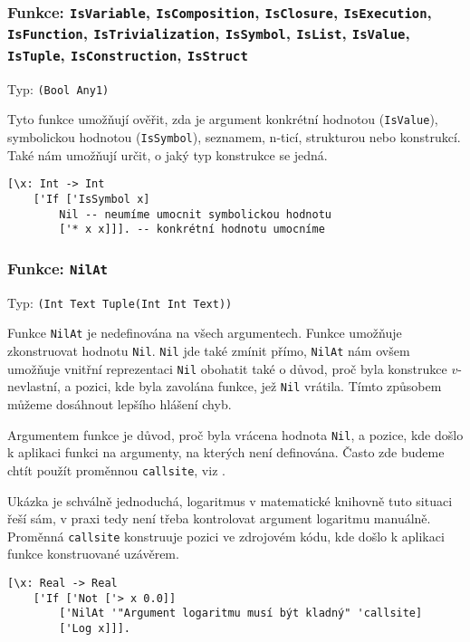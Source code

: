 \subsubsection*{Funkce:
\lstinline{IsVariable},
\lstinline{IsComposition},
\lstinline{IsClosure},
\lstinline{IsExecution},
\lstinline{IsFunction},
\lstinline{IsTrivialization},
\lstinline{IsSymbol},
\lstinline{IsList},
\lstinline{IsValue},
\lstinline{IsTuple},
\lstinline{IsConstruction},
\lstinline{IsStruct}
}

Typ: \lstinline{(Bool Any1)}

Tyto funkce umožňují ověřit, zda je argument konkrétní hodnotou (\lstinline{IsValue}), symbolickou
hodnotou (\lstinline{IsSymbol}), seznamem, n-ticí, strukturou nebo konstrukcí. Také nám umožňují
určit, o jaký typ konstrukce se jedná.

\begin{lstlisting}[caption={Ukázka využití IsSymbol}]
[\x: Int -> Int
    ['If ['IsSymbol x]
        Nil -- neumíme umocnit symbolickou hodnotu
        ['* x x]]]. -- konkrétní hodnotu umocníme
\end{lstlisting}

\subsubsection*{Funkce: \lstinline{NilAt}}\label{nilat-fn}
Typ: \lstinline{(Int Text Tuple(Int Int Text))}

Funkce \lstinline{NilAt} je nedefinována na všech argumentech. Funkce umožňuje zkonstruovat hodnotu
\lstinline{Nil}. \lstinline{Nil} jde také zmínit přímo, \lstinline{NilAt} nám ovšem umožňuje vnitřní
reprezentaci \lstinline{Nil} obohatit také o důvod, proč byla konstrukce $v$-nevlastní, a pozici,
kde byla zavolána funkce, jež \lstinline{Nil} vrátila. Tímto způsobem můžeme dosáhnout lepšího
hlášení chyb.

Argumentem funkce je důvod, proč byla vrácena hodnota \lstinline{Nil}, a pozice, kde došlo
k aplikaci funkci na argumenty, na kterých není definována. Často zde budeme chtít použít proměnnou
\lstinline{callsite}, viz .

Ukázka je schválně jednoduchá, logaritmus v matematické knihovně tuto situaci řeší sám, v praxi tedy
není třeba kontrolovat argument logaritmu manuálně. Proměnná \lstinline{callsite} konstruuje
pozici ve zdrojovém kódu, kde došlo k aplikaci funkce konstruované uzávěrem.

\begin{lstlisting}[caption={Ukázka využití NilAt}]
[\x: Real -> Real
    ['If ['Not ['> x 0.0]]
        ['NilAt '"Argument logaritmu musí být kladný" 'callsite]
        ['Log x]]].
\end{lstlisting}

